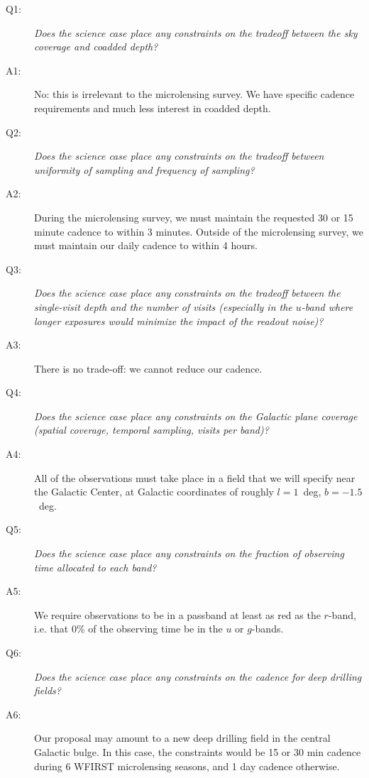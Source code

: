 \begin{description}

\item[Q1:] {\it Does the science case place any constraints on the
tradeoff between the sky coverage and coadded depth?}

\item[A1:] No: this is irrelevant to the microlensing survey. We have
specific cadence requirements and much less interest in coadded depth.

\item[Q2:] {\it Does the science case place any constraints on the
tradeoff between uniformity of sampling and frequency of sampling?}

\item[A2:] During the microlensing survey, we must maintain the
requested 30 or 15 minute cadence to within 3 minutes. Outside of the
microlensing survey, we must maintain our daily cadence to within 4
hours.

\item[Q3:] {\it Does the science case place any constraints on the
tradeoff between the single-visit depth and the number of visits
(especially in the $u$-band where longer exposures would minimize the
impact of the readout noise)?}

\item[A3:] There is no trade-off: we cannot reduce our cadence.

\item[Q4:] {\it Does the science case place any constraints on the
Galactic plane coverage (spatial coverage, temporal sampling, visits per
band)?}

\item[A4:] All of the observations must take place in a field that we
will specify near the Galactic Center, at Galactic coordinates of
roughly $l = 1$~deg, $b = -1.5$~deg.

\item[Q5:] {\it Does the science case place any constraints on the
fraction of observing time allocated to each band?}

\item[A5:] We  require observations to be in a passband at least as red
as the $r$-band, i.e. that 0\% of the observing time be in the $u$ or
$g$-bands.

\item[Q6:] {\it Does the science case place any constraints on the
cadence for deep drilling fields?}

\item[A6:] Our proposal may amount to a new deep drilling field in the
central Galactic bulge. In this case, the constraints would be 15 or 30
min cadence during 6 WFIRST microlensing seasons, and 1 day cadence
otherwise.


\end{description}
